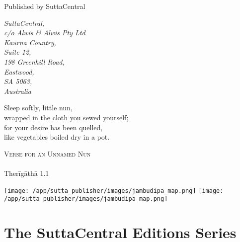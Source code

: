 \documentclass[12pt,openany]{book}%
\newcommand{\blankpage}{
\newpage
\thispagestyle{empty}
\mbox{}
\newpage
}
\newcommand*{\epigraphTranslatedTitle}[1]{\vspace*{.5em}\footnotesize\textsc{#1}\\}%
\newcommand*{\epigraphRootTitle}[1]{\footnotesize\textit{#1}\\}%
\newcommand*{\epigraphReference}[1]{\footnotesize{#1}}%
\begin{document}
\begin{footnotesize}
\medskip

Published by SuttaCentral

\medskip

\textit{SuttaCentral,\\
c/o Alwis \& Alwis Pty Ltd\\
Kaurna Country,\\
Suite 12,\\
198 Greenhill Road,\\
Eastwood,\\
SA 5063,\\
Australia}

\end{footnotesize}

\newpage

\setlength{\parindent}{1em}%
\newpage

\vspace*{\fill}

\begin{center}
\epigraph{Sleep softly, little nun,\\
wrapped in the cloth you sewed yourself;\\
for your desire has been quelled,\\
like vegetables boiled dry in a pot.}
{
\epigraphTranslatedTitle{Verse for an Unnamed Nun}
\epigraphRootTitle{}
\epigraphReference{\textsanskrit{Therīgāthā} 1.1}
}
\end{center}

\vspace*{2in}

\vspace*{\fill}

\setlength{\parindent}{0em}
\sbox{}%
\texttt{[image: /app/sutta\_publisher/images/jambudipa\_map.png]}
\newpage
\texttt{[image: /app/sutta\_publisher/images/jambudipa\_map.png]}
\newpage
\restoregeometry

\blankpage%

\setlength{\parindent}{1em}
%
\tableofcontents
\newpage
\pagestyle{fancy}
%
\chapter*{The SuttaCentral Editions Series}
\end{document}
